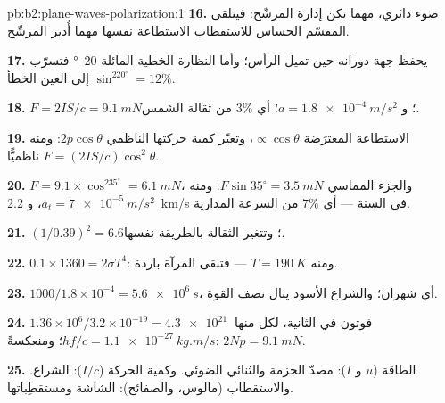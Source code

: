 \begin{solution}{pb:b2:plane-waves-polarization:1}
\textbf{16.} ضوء دائري، مهما تكن إدارة المرشّح: فيتلقى
المقسّم الحساس للاستقطاب الاستطاعة نفسها مهما أُدير
المرشّح.

\textbf{17.} يحفظ  جهة دورانه حين تميل
الرأس؛ وأما النظارة الخطية المائلة \qty{20}{\degree} فتسرّب $\sin^220^\circ = 12\%$ إلى
العين الخطأ.

\textbf{18.} $F = 2IS/c = \qty{9.1}{mN}$؛ و $a = \qty{1.8e-4}{m/s^2}$؛ أي $3\%$ من ثقالة
الشمس.

\textbf{19.} الاستطاعة المعترَضة $\propto\cos\theta$، وتغيّر كمية حركتها
الناظمي $2p\cos\theta$: ومنه $F = (2IS/c)\cos^2\theta$ ناظميًّا.

\textbf{20.} $F = 9.1 \times \cos^235^\circ = \qty{6.1}{mN}$، والجزء المماسي $F\sin35^\circ
= \qty{3.5}{mN}$: ومنه $a_t = \qty{7e-5}{m/s^2}$، و \qty{2.2}{km/s} في السنة --- أي $7\%$ من
السرعة المدارية.

\textbf{21.} $(1/0.39)^2 = 6.6$؛ وتتغير الثقالة بالطريقة نفسها.

\textbf{22.} $0.1 \times 1360 = 2\sigma T^4$: ومنه $T = \qty{190}{K}$ --- فتبقى المرآة
باردة.

\textbf{23.} $1000/1.8 \times 10^{-4} = \qty{5.6e6}{s}$، أي شهران؛ والشراع الأسود
ينال نصف القوة.

\textbf{24.} $1.36 \times 10^6/3.2 \times 10^{-19} = \qty{4.3e21}{}$ فوتون في الثانية،
لكل منها $hf/c = \qty{1.1e-27}{kg.m/s}$؛ ومنعكسةً: $2Np = \qty{9.1}{mN}$.

\textbf{25.} الطاقة ($u$ و $I$): مصدّ الحزمة والثنائي الضوئي.
وكمية الحركة ($I/c$): الشراع. والاستقطاب (مالوس، والصفائح):
الشاشة ومستقطِباتها.
\end{solution}
